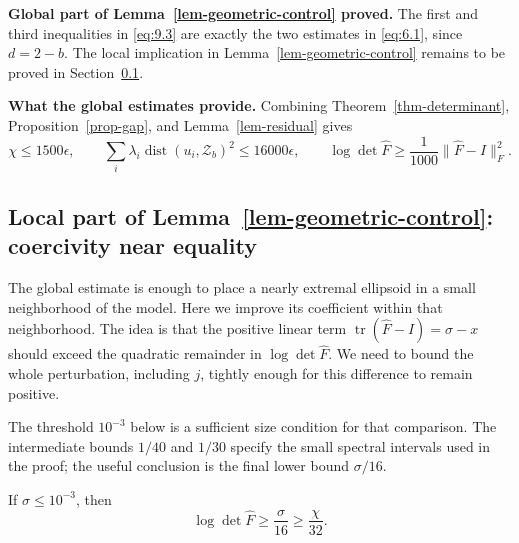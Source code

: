 \textbf{Global part of Lemma~\ref{lem-geometric-control} proved.} The first and third inequalities in
\eqref{eq:9.3} are exactly the two estimates in \eqref{eq:6.1}, since $d=2-b$.
The local implication in Lemma~\ref{lem-geometric-control} remains to be proved in Section~\ref{sec:9.3}.

\textbf{What the global estimates provide.} Combining Theorem~\ref{thm-determinant}, Proposition~\ref{prop-gap},
and Lemma~\ref{lem-residual} gives
\begin{equation}\label{eq:9.8}
\chi\le1500\epsilon,\qquad
\sum_i\lambda_i\operatorname{dist}(u_i,\mathcal Z_b)^2\le16000\epsilon,
\qquad
\log\det\widehat F\ge\frac1{1000}\|\widehat F-I\|_F^2.
\end{equation}

\subsection{Local part of Lemma~\ref{lem-geometric-control}: coercivity near equality}\label{sec:9.3}

The global estimate is enough to place a nearly extremal ellipsoid in a small
neighborhood of the model. Here we improve its coefficient within that
neighborhood. The idea is that the positive linear term
$\operatorname{tr}(\widehat F-I)=\sigma-x$ should exceed the quadratic remainder
in $\log\det\widehat F$. We need to bound the whole perturbation, including
$j$, tightly enough for this difference to remain positive.

The threshold $10^{-3}$ below is a sufficient size condition for that
comparison. The intermediate bounds $1/40$ and $1/30$ specify the small
spectral intervals used in the proof; the useful conclusion is the final
lower bound $\sigma/16$.

\begin{lemma}\label{lem-local}
If $\sigma\le10^{-3}$, then
\begin{equation}\label{eq:9.9}
\log\det\widehat F\ge\frac\sigma{16}\ge\frac\chi{32}.
\end{equation}

\end{lemma}

